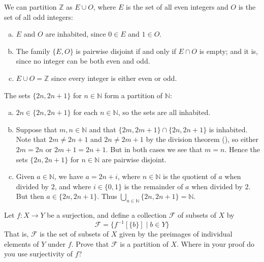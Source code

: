 \begin{example}
\label{exPartitionOfZIntoEvenAndOdd}
We can partition $\mathbb{Z}$ as $E \cup O$, where $E$ is the set of all even integers and $O$ is the set of all odd integers:
\begin{enumerate}[(a)]
\item $E$ and $O$ are inhabited, since $0 \in E$ and $1 \in O$.
\item The family $\{ E, O \}$ is pairwise disjoint if and only if $E \cap O$ is empty; and it is, since no integer can be both even and odd.
\item $E \cup O = \mathbb{Z}$ since every integer is either even or odd.
\end{enumerate}
\end{example}

\begin{example}
\label{exPartitionOfNIntoPairs}
The sets $\{ 2n, 2n+1 \}$ for $n \in \mathbb{N}$ form a partition of $\mathbb{N}$:
\begin{enumerate}[(a)]
\item $2n \in \{ 2n, 2n+1 \}$ for each $n \in \mathbb{N}$, so the sets are all inhabited.
\item Suppose that $m,n \in \mathbb{N}$ and that $\{ 2m, 2m+1 \} \cap \{ 2n, 2n+1 \}$ is inhabited. Note that $2m \ne 2n+1$ and $2n \ne 2m+1$ by the division theorem (), so either $2m=2n$ or $2m+1=2n+1$. But in both cases we see that $m=n$. Hence the sets $\{ 2n, 2n+1 \}$ for $n \in \mathbb{N}$ are pairwise disjoint. 
\item Given $a \in \mathbb{N}$, we have $a=2n+i$, where $n \in \mathbb{N}$ is the quotient of $a$ when divided by $2$, and where $i \in \{0,1\}$ is the remainder of $a$ when divided by $2$. But then $a \in \{ 2n, 2n+1 \}$. Thus $\bigcup_{n \in \mathbb{N}} \{ 2n, 2n+1 \} = \mathbb{N}$.
\end{enumerate}
\end{example}

\begin{exercise}
\label{exPreimagesFormPartition}
Let $f : X \to Y$ be a surjection, and define a collection $\mathcal{F}$ of subsets of $X$ by
\[ \mathcal{F} = \{ f^{-1}[\{b\}] \mid b \in Y \} \]
That is, $\mathcal{F}$ is the set of subsets of $X$ given by the preimages of individual elements of $Y$ under $f$. Prove that $\mathcal{F}$ is a partition of $X$. Where in your proof do you use surjectivity of $f$?
\end{exercise}

